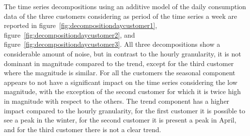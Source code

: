 The time series decompositions using an additive model of the daily consumption data of the three customers considering as period of the time series a week are reported in figure~\ref{fig:decompositiondaycustomer1}, figure~\ref{fig:decompositiondaycustomer2}, and figure~\ref{fig:decompositiondaycustomer3}.
All three decompositions show a considerable amount of noise, but in contrast to the hourly granularity, it is not dominant in magnitude compared to the trend, except for the third customer where the magnitude is similar.
For all the customers the seasonal component appears to not have a significant impact on the time series considering the low magnitude, with the exception of the second customer for which it is twice high in magnitude with respect to the others.
The trend component has a higher impact compared to the hourly granularity, for the first customer it is possible to see a peak in the winter, for the second customer it is present a peak in April, and for the third customer there is not a clear trend.

